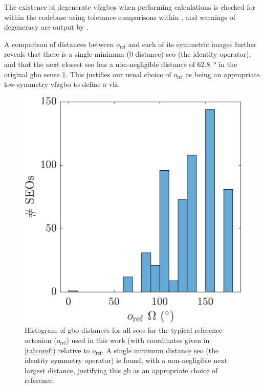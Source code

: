 \documentclass[preprint,12pt]{elsarticle}
\begin{document}
The existence of degenerate \glspl{vfzgbo} when performing calculations is checked for within the codebase using tolerance comparisons within , and warnings of degeneracy are output by .

A comparison of distances between  $o_{\text{ref}}$ and each of its symmetric images further reveals that there is a single minimum (0 distance) \gls{seo} (the identity operator), and that the next closest \gls{seo} has a non-negligible distance of \SI{62.8}{\degree} in the original \gls{gbo} sense \cref{fig:oref-seo-dist}. This justifies our usual choice of $o_{\text{ref}}$ as being an appropriate low-symmetry \gls{vfzgbo} to define a \gls{vfz}.

\begin{figure}
    \centering
    \includegraphics{figures/oref-seo-dist.png}
    \caption{ Histogram of \gls{gbo} distances for all \glspl{seo} for the typical reference octonion ($o_\text{ref}$) used in this work (with coordinates given in \cref{tab:oref}) relative to $o_\text{ref}$. A single minimum distance \gls{seo} (the identity symmetry operator) is found, with a non-negligible next largest distance, justifying this \gls{gb} as an appropriate choice of reference. }
    \label{fig:oref-seo-dist}
\end{figure}
\end{document}
